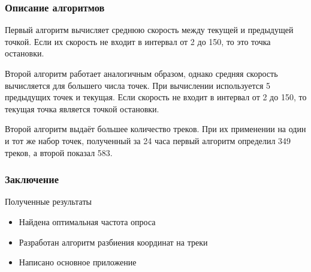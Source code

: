 \documentclass[hyperref={unicode}]{beamer}
\begin{document}
\begin{frame}
\frametitle{Описание алгоритмов}
Первый алгоритм вычисляет среднюю скорость между текущей и предыдущей точкой. Если их скорость не входит в интервал от 2 до 150, то это точка остановки.

Второй алгоритм работает аналогичным образом, однако средняя скорость вычисляется для большего числа точек.
При вычислении используется 5 предыдущих точек и текущая. Если скорость не входит в интервал от 2 до 150, то текущая точка
является точкой остановки.

Второй алгоритм выдаёт большее количество треков. При их применении на один и тот же набор точек, полученный за 24 часа первый алгоритм определил 349 треков, а второй показал 583.

\end{frame}

\begin{frame}
  \frametitle{Заключение}
  
  Полученные результаты
  
  \begin{itemize}
  	\item Найдена оптимальная частота опроса
  	\item Разработан алгоритм разбиения координат на треки
  	\item Написано основное приложение
  \end{itemize}
  
\end{frame}
\end{document}
